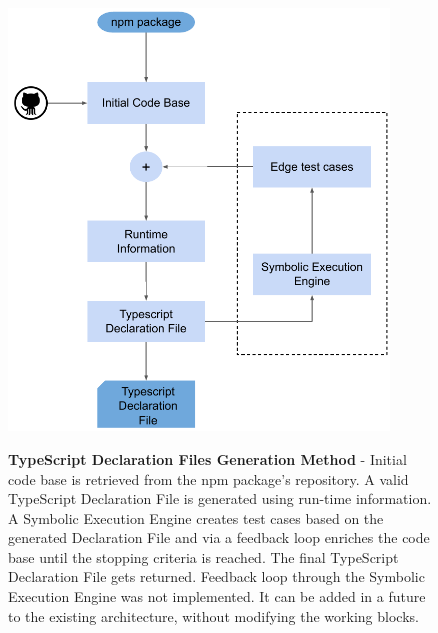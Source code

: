 \begin{figure}[h]
\begin{centering}
    {\includegraphics[width=0.9\textwidth]{figures/approach/typescript-declaration-files-generation-method/typescript_declaration_files_generation_method_block_diagram.pdf}}
    \caption[TypeScript Declaration Files Generation Method]{\textbf{TypeScript Declaration Files Generation Method} - Initial code base is retrieved from the npm package's repository. A valid TypeScript Declaration File is generated using run-time information. A Symbolic Execution Engine creates test cases based on the generated Declaration File and via a feedback loop enriches the code base until the stopping criteria is reached. The final TypeScript Declaration File gets returned. Feedback loop through the Symbolic Execution Engine was not implemented. It can be added in a future to the existing architecture, without modifying the working blocks.}
    \label{fig:tsd_generation_method_block_diagram}
\end{centering}
\end{figure}
